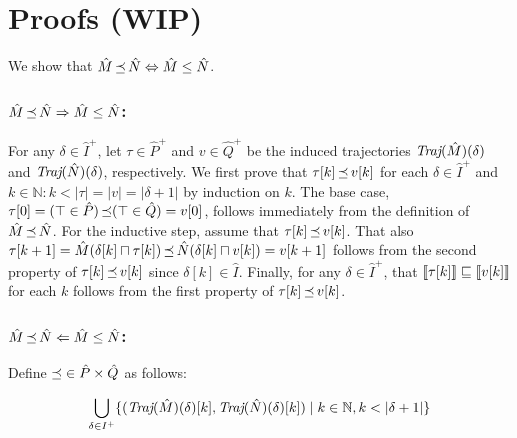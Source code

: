 \section{Proofs (WIP)}

We show that $\hat M \operatorname{\mathrel{\preceq}} \hat N \Leftrightarrow \hat M \leq \hat N$.

\subsubsection{$\hat M \operatorname{\mathrel{\preceq}} \hat N \Rightarrow \hat M \leq \hat N$:} For any $\delta \in \hat I^{+}$, let $\tau \in \hat P^{+}$ and $v \in \hat Q^{+}$ be the induced trajectories $\textit{Traj}(\hat M)(\delta)$ and $\textit{Traj}(\hat N)(\delta)$, respectively. We first prove that $\tau[k] \operatorname{\mathrel{\preceq}} v[k]$ for each $\delta \in \hat I^{+}$ and $k \in \mathbb{N} : k < | \tau | = | v | = | \delta + 1 |$ by induction on $k$. The base case, $\tau[0] = (\top \in \hat P) \operatorname{\mathrel{\preceq}} (\top \in \hat Q) = v[0]$, follows immediately from the definition of $\hat M \operatorname{\mathrel{\preceq}} \hat N$. For the inductive step, assume that $\tau[k] \operatorname{\mathrel{\preceq}} v[k]$. That also $\tau[k+1] = \hat M(\delta[k] \sqcap \tau[k]) \operatorname{\mathrel{\preceq}} \hat N(\delta[k] \sqcap v[k]) = v[k+1]$ follows from the second property of $\tau[k] \operatorname{\mathrel{\preceq}} v[k]$ since $\delta[k] \in \hat I$. Finally, for any $\delta \in \hat I^{+}$, that $\llbracket\tau[k]\rrbracket \sqsubseteq \llbracket v[k]\rrbracket$ for each $k$ follows from the first property of $\tau[k] \operatorname{\mathrel{\preceq}} v[k]$.


\subsubsection{$\hat M \operatorname{\mathrel{\preceq}} \hat N \Leftarrow \hat M \leq \hat N$:} Define $\operatorname{\mathrel{\preceq}} \in \hat P \times \hat Q$ as follows:

\begin{equation*}
\bigcup_{\delta \in I^{+}} \{ (\textit{Traj}(\hat M)(\delta)[k], \textit{Traj}(\hat N)(\delta)[k]) \mid k \in \mathbb{N}, k < | \delta + 1 | \}
\end{equation*}

